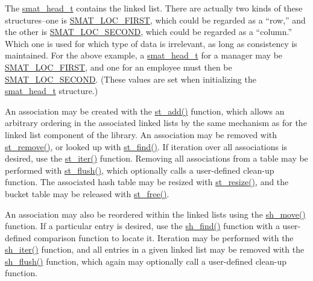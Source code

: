 The \hyperlink{group__dbprim__smat_ga1}{smat\_\-head\_\-t} contains the linked list. There are actually two kinds of these structures--one is \hyperlink{group__dbprim__smat_gga70a137}{SMAT\_\-LOC\_\-FIRST}, which could be regarded as a ``row,'' and the other is \hyperlink{group__dbprim__smat_gga70a138}{SMAT\_\-LOC\_\-SECOND}, which could be regarded as a ``column.'' Which one is used for which type of data is irrelevant, as long as consistency is maintained. For the above example, a \hyperlink{group__dbprim__smat_ga1}{smat\_\-head\_\-t} for a manager may be \hyperlink{group__dbprim__smat_gga70a137}{SMAT\_\-LOC\_\-FIRST}, and one for an employee must then be \hyperlink{group__dbprim__smat_gga70a138}{SMAT\_\-LOC\_\-SECOND}. (These values are set when initializing the \hyperlink{group__dbprim__smat_ga1}{smat\_\-head\_\-t} structure.)

An association may be created with the \hyperlink{group__dbprim__smat_ga13}{st\_\-add()} function, which allows an arbitrary ordering in the associated linked lists by the same mechanism as for the linked list component of the library. An association may be removed with \hyperlink{group__dbprim__smat_ga14}{st\_\-remove()}, or looked up with \hyperlink{group__dbprim__smat_ga15}{st\_\-find()}. If iteration over all associations is desired, use the \hyperlink{group__dbprim__smat_ga16}{st\_\-iter()} function. Removing all associations from a table may be performed with \hyperlink{group__dbprim__smat_ga17}{st\_\-flush()}, which optionally calls a user-defined clean-up function. The associated hash table may be resized with \hyperlink{group__dbprim__smat_ga18}{st\_\-resize()}, and the bucket table may be released with \hyperlink{group__dbprim__smat_ga19}{st\_\-free()}.

An association may also be reordered within the linked lists using the \hyperlink{group__dbprim__smat_ga21}{sh\_\-move()} function. If a particular entry is desired, use the \hyperlink{group__dbprim__smat_ga22}{sh\_\-find()} function with a user-defined comparison function to locate it. Iteration may be performed with the \hyperlink{group__dbprim__smat_ga23}{sh\_\-iter()} function, and all entries in a given linked list may be removed with the \hyperlink{dbprim_8h_a178}{sh\_\-flush()} function, which again may optionally call a user-defined clean-up function.

